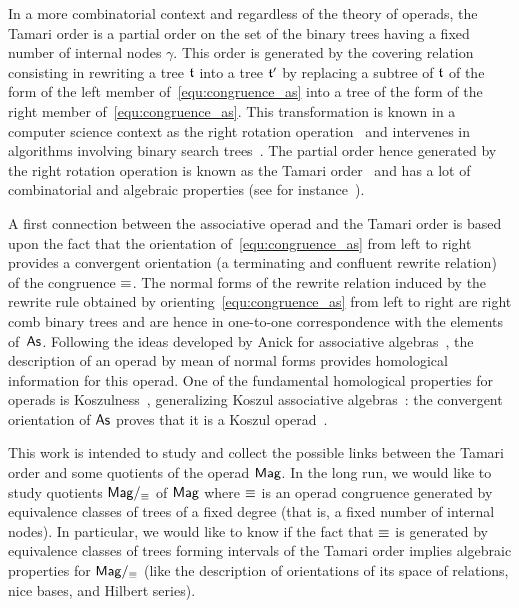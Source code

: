 In a more combinatorial context and regardless of the theory of operads,
the Tamari order is a partial order on the set of the binary trees
having a fixed number of internal nodes $\gamma$. This order is
generated by the covering relation consisting in rewriting a tree $\mathfrak{t}$
into a tree $\mathfrak{t}'$ by replacing a subtree of $\mathfrak{t}$ of the form of the
left member of~\eqref{equ:congruence_as} into a tree of the form of the
right member of~\eqref{equ:congruence_as}. This transformation is known
in a computer science context as the right rotation
operation~\cite{Knu98} and intervenes in algorithms involving binary
search trees~\cite{AVL62}. The partial order hence generated by the
right rotation operation is known as the Tamari order~\cite{Tam62} and
has a lot of combinatorial and algebraic properties (see for
instance~\cite{HT72,Cha06}).
\medbreak

A first connection between the associative operad and the Tamari order
is based upon the fact that the orientation of~\eqref{equ:congruence_as}
from left to right provides a convergent orientation (a terminating and
confluent rewrite relation) of the congruence $\operatorname{\equiv}$. The normal
forms of the rewrite relation induced by the rewrite rule obtained by
orienting~\eqref{equ:congruence_as} from left to right are right comb
binary trees and are hence in one-to-one correspondence with the
elements of~$\mathsf{As}$. Following the ideas developed by Anick for
associative algebras~\cite{Ani86}, the description of an operad by mean
of normal forms provides homological information for this operad. One of
the fundamental homological properties for operads is
Koszulness~\cite{GK94}, generalizing Koszul associative
algebras~\cite{Pri70}: the convergent orientation of $\mathsf{As}$ proves that
it is a Koszul operad~\cite{LV12}.
\medbreak

This work is intended to study and collect the possible links between
the Tamari order and some quotients of the operad $\mathsf{Mag}$. In the long
run, we would like to study quotients $\mathsf{Mag}/_{\operatorname{\equiv}}$ of $\mathsf{Mag}$ where
$\operatorname{\equiv}$ is an operad congruence generated by equivalence classes of
trees of a fixed degree (that is, a fixed number of internal nodes). In
particular, we would like to know if the fact that $\operatorname{\equiv}$ is generated
by equivalence classes of trees forming intervals of the Tamari order
implies algebraic properties for $\mathsf{Mag}/_{\operatorname{\equiv}}$ (like the description
of orientations of its space of relations, nice bases, and Hilbert
series).
\medbreak

